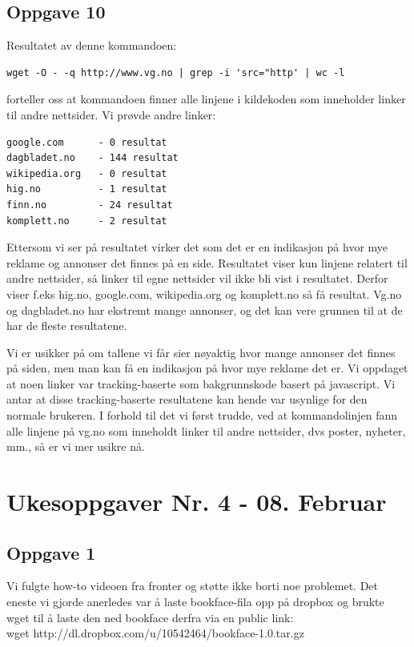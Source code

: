 \documentclass[a4paper, norsk, 12pt]{article}
\begin{document}
\subsection{Oppgave 10}
Resultatet av denne kommandoen:
\begin{verbatim}
wget -O - -q http://www.vg.no | grep -i 'src="http' | wc -l
\end{verbatim}
forteller oss at kommandoen finner alle linjene i kildekoden som inneholder linker til andre nettsider.
Vi prøvde andre linker:
\begin{verbatim}
google.com      - 0 resultat
dagbladet.no    - 144 resultat
wikipedia.org   - 0 resultat
hig.no          - 1 resultat
finn.no         - 24 resultat
komplett.no     - 2 resultat
\end{verbatim}

Ettersom vi ser på resultatet virker det som det er en indikasjon på hvor mye reklame og annonser det finnes på en side. Resultatet viser kun linjene relatert til andre nettsider, så linker til egne nettsider vil ikke bli vist i resultatet. Derfor viser f.eks hig.no, google.com, wikipedia.org og komplett.no så få resultat. Vg.no og dagbladet.no har ekstremt mange annonser, og det kan vere grunnen til at de har de fleste resultatene.

Vi er usikker på om tallene vi får sier nøyaktig hvor mange annonser det finnes på siden, men man kan få en indikasjon på hvor mye reklame det er. Vi oppdaget at noen linker var tracking-baserte som bakgrunnskode basert på javascript. Vi antar at disse tracking-baserte resultatene kan hende var usynlige for den normale brukeren. I forhold til det vi først trudde, ved at kommandolinjen fann alle linjene på vg.no som inneholdt linker til andre nettsider, dvs poster, nyheter, mm., så er vi mer usikre nå. 

\section{Ukesoppgaver Nr. 4 - 08. Februar}
\subsection{Oppgave 1}
Vi fulgte how-to videoen fra fronter og støtte ikke borti noe problemet. Det eneste vi gjorde anerledes var å laste bookface-fila opp på dropbox og brukte wget til å laste den ned bookface derfra via en public link:\\
 wget http://dl.dropbox.com/u/10542464/bookface-1.0.tar.gz

%

\end{document}
